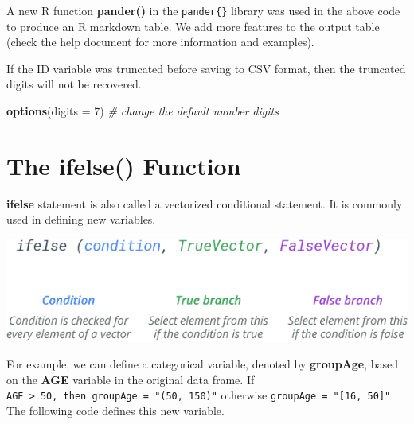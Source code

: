 \documentclass[
]{book}
\newenvironment{Shaded}{\begin{snugshade}}{\end{snugshade}}
\newcommand{\AttributeTok}[1]{\textcolor[rgb]{0.13,0.29,0.53}{#1}}
\newcommand{\CommentTok}[1]{\textcolor[rgb]{0.56,0.35,0.01}{\textit{#1}}}
\newcommand{\DecValTok}[1]{\textcolor[rgb]{0.00,0.00,0.81}{#1}}
\newcommand{\FunctionTok}[1]{\textcolor[rgb]{0.13,0.29,0.53}{\textbf{#1}}}
\newcommand{\NormalTok}[1]{#1}
\newcommand{\OtherTok}[1]{\textcolor[rgb]{0.56,0.35,0.01}{#1}}
\newcommand{\SpecialCharTok}[1]{\textcolor[rgb]{0.81,0.36,0.00}{\textbf{#1}}}
\newcommand{\StringTok}[1]{\textcolor[rgb]{0.31,0.60,0.02}{#1}}
\begin{document}
A new R function \textbf{pander()} in the \texttt{pander\{\}} library was used in the above code to produce an R markdown table. We add more features to the output table (check the help document for more information and examples).

If the ID variable was truncated before saving to CSV format, then the truncated digits will not be recovered.

\begin{Shaded}
\begin{Highlighting}[]
\FunctionTok{options}\NormalTok{(}\AttributeTok{digits =} \DecValTok{7}\NormalTok{)  }\CommentTok{\# change the default number digits}
\end{Highlighting}
\end{Shaded}

\hfill\break

\hypertarget{the-ifelse-function}{%
\section{\texorpdfstring{The \textbf{ifelse()} Function}{The ifelse() Function}}\label{the-ifelse-function}}

\textbf{ifelse} statement is also called a vectorized conditional statement. It is commonly used in defining new variables.

\begin{center}\includegraphics[width=0.7\linewidth]{img03/r-ifelse-function-syntax} \end{center}

For example, we can define a categorical variable, denoted by \textbf{groupAge}, based on the \textbf{AGE} variable in the original data frame. If
\texttt{AGE\ \textgreater{}\ 50,\ then\ groupAge\ =\ "(50,\ 150)"} otherwise \texttt{groupAge\ =\ "{[}16,\ 50{]}"} The following code defines this new variable.

\begin{Shaded}
\end{Shaded}
\end{document}
